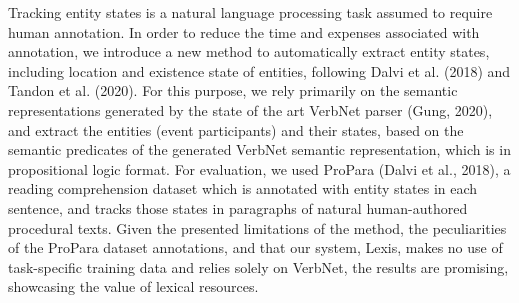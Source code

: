 Tracking entity states is a natural language processing task assumed to require human annotation. In order to reduce the time and expenses associated with annotation, we introduce a new method to automatically extract entity states, including location and existence state of entities, following Dalvi et al. (2018) and Tandon et al. (2020). For this purpose, we rely primarily on the semantic representations generated by the state of the art VerbNet parser (Gung, 2020), and extract the entities (event participants) and their states, based on the semantic predicates of the generated VerbNet semantic representation, which is in propositional logic format. For evaluation, we used ProPara (Dalvi et al., 2018), a reading comprehension dataset which is annotated with entity states in each sentence, and tracks those states in paragraphs of natural human-authored procedural texts. Given the presented limitations of the method, the peculiarities of the ProPara dataset annotations, and that our system, Lexis, makes no use of task-specific training data and relies solely on VerbNet, the results are promising, showcasing the value of lexical resources.

